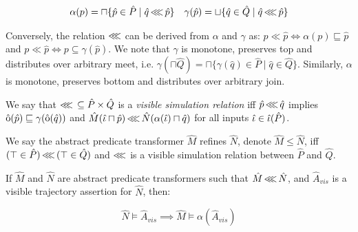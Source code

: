 \begin{align*}
\alpha(p) = \sqcap \{ \hat p \in \hat P \mid \hat q \operatorname{\lll} \hat p \} && \gamma(\hat p) = \sqcup \{ \hat q \in \hat Q \mid \hat q \operatorname{\lll} \hat p \}
\end{align*}

\noindent Conversely, the relation $\operatorname{\lll}$ can be derived from $\alpha$ and $\gamma$ as: $p \ll \hat p \iff \alpha(p) \sqsubseteq \hat p$ and $p \ll \hat p \iff p \subseteq \gamma(\hat p)$. We note that $\gamma$ is monotone, preserves top and distributes over arbitrary meet, i.e. $\gamma(\sqcap \hat Q) = \sqcap \{ \gamma(\hat q) \in \hat P \mid \hat q \in \hat Q\}$. Similarly, $\alpha$ is monotone, preserves bottom and distributes over arbitrary join.

We say that $\operatorname{\lll} \, \subseteq \hat P \times \hat Q$ is a \textit{visible simulation relation} iff $\hat p \operatorname{\lll} \hat q$ implies $\operatorname{\hat{\mathrm{o}}}(\hat p) \sqsubseteq \gamma(\operatorname{\hat{\mathrm{o}}}(\hat q))$ and $\hat M(\hat \iota \sqcap \hat p) \operatorname{\lll} \hat N(\alpha(\hat \iota) \sqcap \hat q)$ for all inputs $\hat \iota \in \operatorname{\hat{\iota}}(\hat P)$.

We say the abstract predicate transformer $\hat M$ refines $\hat N$, denote $\hat M \leq \hat N$, iff $(\top \in \hat P) \operatorname{\lll} \, (\top \in \hat Q)$ and $\operatorname{\lll}$ is a visible simulation relation between $\hat P$ and $\hat Q$.


\begin{theorem}
\label{thm:refinement}
If $\hat M$ and $\hat N$ are abstract predicate transformers such that $\hat M \operatorname{\lll} \hat N$, and $\hat A_{vis}$ is a visible trajectory assertion for $\hat N$, then:

\begin{equation*}
\hat N \models \hat A_{vis} \implies \hat M \models \alpha(\hat A_{vis})
\end{equation*}
\end{theorem}
